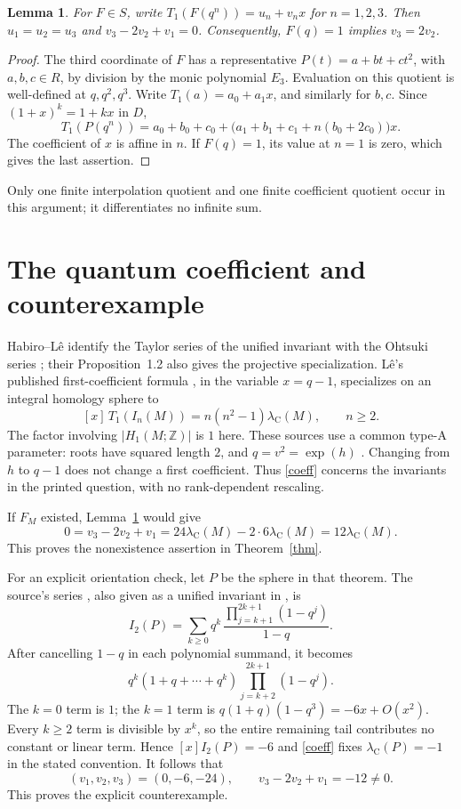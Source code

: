 \documentclass[11pt]{article}
\newtheorem{lemma}{Lemma}
\newcommand{\Z}{\mathbb Z}
\newcommand{\Cass}{\lambda_{\mathrm C}}
\begin{document}
\begin{lemma}\label{lem}
For $F\in S$, write $T_1(F(q^n))=u_n+v_nx$ for $n=1,2,3$.
Then $u_1=u_2=u_3$ and $v_3-2v_2+v_1=0$.
Consequently, $F(q)=1$ implies $v_3=2v_2$.
\end{lemma}
\begin{proof}
The third coordinate of $F$ has a representative
$P(t)=a+bt+ct^2$, with $a,b,c\in R$, by division by the monic
polynomial $E_3$. Evaluation on this quotient is well-defined at
$q,q^2,q^3$. Write $T_1(a)=a_0+a_1x$, and similarly for $b,c$.
Since $(1+x)^k=1+kx$ in $D$,
\[
 T_1(P(q^n))=
 a_0+b_0+c_0+
 \bigl(a_1+b_1+c_1+n(b_0+2c_0)\bigr)x .
\]
The coefficient of $x$ is affine in $n$. If $F(q)=1$, its value at
$n=1$ is zero, which gives the last assertion.
\end{proof}
Only one finite interpolation quotient and one finite coefficient
quotient occur in this argument; it differentiates no infinite sum.

\section{The quantum coefficient and counterexample}
Habiro--L\^e identify the Taylor series of the unified invariant with
the Ohtsuki series \cite[Proposition~1.9]{HL}; their
Proposition~1.2 also gives the projective specialization.
L\^e's published first-coefficient formula
\cite[p.~821]{L}, in the variable $x=q-1$, specializes on an integral
homology sphere to
\begin{equation}\label{coeff}
 [x]\,T_1(I_n(M))=n(n^2-1)\Cass(M),\qquad n\ge2 .
\end{equation}
The factor involving $|H_1(M;\Z)|$ is $1$ here.
These sources use a common type-A parameter: roots have squared length
$2$, and $q=v^2=\exp(h)$ \cite[\S3A1--2]{HL}.
Changing from $h$ to $q-1$ does not change a first coefficient.
Thus \eqref{coeff} concerns the invariants in the printed question,
with no rank-dependent rescaling.

If $F_M$ existed, Lemma~\ref{lem} would give
\[
 0=v_3-2v_2+v_1
   =24\Cass(M)-2\cdot6\Cass(M)=12\Cass(M).
\]
This proves the nonexistence assertion in Theorem~\ref{thm}.

For an explicit orientation check, let $P$ be the sphere in that theorem.
The source's series \cite[p.~492]{O}, also given as a unified invariant
in \cite[\S16.1, equation~(16.1)]{H}, is
\[
 I_2(P)=\sum_{k\ge0}
       q^k\,\frac{\prod_{j=k+1}^{2k+1}(1-q^j)}{1-q}.
\]
After cancelling $1-q$ in each polynomial summand, it becomes
\[
 q^k(1+q+\cdots+q^k)
       \prod_{j=k+2}^{2k+1}(1-q^j).
\]
The $k=0$ term is $1$; the $k=1$ term is
$q(1+q)(1-q^3)=-6x+O(x^2)$.
Every $k\ge2$ term is divisible by $x^k$, so the entire remaining
tail contributes no constant or linear term.
Hence $[x]I_2(P)=-6$ and \eqref{coeff} fixes $\Cass(P)=-1$
in the stated convention. It follows that
\[
 (v_1,v_2,v_3)=(0,-6,-24),\qquad
 v_3-2v_2+v_1=-12\ne0.
\]
This proves the explicit counterexample.\hfill\qedsymbol
\end{document}
